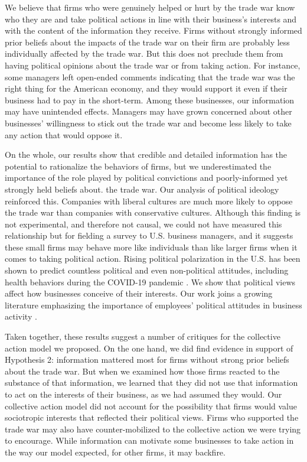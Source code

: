 \documentclass{article}
\begin{document}
We believe that firms who were genuinely helped or hurt by the trade war know who they are and take political actions in line with their business's interests and with the content of the information they receive. Firms without strongly informed prior beliefs about the impacts of the trade war on their firm are probably less individually affected by the trade war. But this does not preclude them from having political opinions about the trade war or from taking action. For instance, some managers left open-ended comments indicating that the trade war was the right thing for the American economy, and they would support it even if their business had to pay in the short-term. Among these businesses, our information may have unintended effects. Managers may have grown concerned about other businesses' willingness to stick out the trade war and become less likely to take any action that would oppose it.

On the whole, our results show that credible and detailed information has the potential to rationalize the behaviors of firms, but we underestimated the importance of the role played by political convictions and poorly-informed yet strongly held beliefs about. the trade war. Our analysis of political ideology reinforced this. Companies with liberal cultures are much more likely to oppose the trade war than companies with conservative cultures. Although this finding is not experimental, and therefore not causal, we could not have measured this relationship but for fielding a survey to U.S. business managers, and it suggests these small firms may behave more like individuals than like larger firms when it comes to taking political action. Rising political polarization in the U.S. has been shown to predict countless political and even non-political attitudes, including health behaviors during the COVID-19 pandemic \citep{mccarty2016polarized,gadarian2021partisanship}. We show that political views affect how businesses conceive of their interests. Our work joins a growing literature emphasizing the importance of employees' political attitudes in business activity \citep{duchin2021political}.

Taken together, these results suggest a number of critiques for the collective action model we proposed. On the one hand, we did find evidence in support of Hypothesis 2: information mattered most for firms without strong prior beliefs about the trade war. But when we examined how those firms reacted to the substance of that information, we learned that they did not use that information to act on the interests of their business, as we had assumed they would. Our collective action model did not account for the possibility that firms would value sociotropic interests that reflected their political views. Firms who supported the trade war may also have counter-mobilized to the collective action we were trying to encourage. While information can motivate some businesses to take action in the way our model expected, for other firms, it may backfire.
\end{document}
